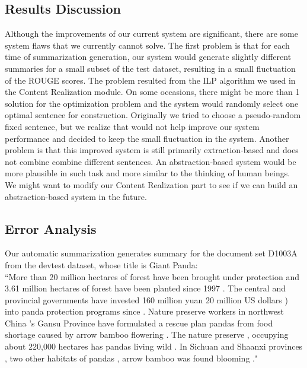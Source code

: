 \documentclass[11pt]{article}
\begin{document}
\subsection{Results Discussion}
Although the improvements of our current system are significant, there are some system flaws that we currently cannot solve. The first problem is that for each time of summarization generation, our system would generate slightly different summaries for a small subset of the test dataset, resulting in a small fluctuation of the ROUGE scores. The problem resulted from the ILP algorithm we used in the Content Realization module. On some occasions, there might be more than 1 solution for the optimization problem and the system would randomly select one optimal sentence for construction. Originally we tried to choose a pseudo-random fixed sentence, but we realize that would not help improve our system performance and decided to keep the small fluctuation in the system.
\indent
Another problem is that this improved system is still primarily extraction-based and does not combine combine different sentences. An abstraction-based system would be more plausible in such task and more similar to the thinking of human beings. We might want to modify our Content Realization part to see if we can build an abstraction-based system in the future.
\subsection{Error Analysis}
Our automatic summarization generates summary for the document set D1003A from the devtest dataset, whose title is Giant Panda:\\

``More than 20 million hectares of forest have been brought under protection and 3.61 million hectares of forest have been planted since 1997 .
The central and provincial governments have invested 160 million yuan 20 million US dollars ) into panda protection programs since .
Nature preserve workers in northwest China 's Gansu Province have formulated a rescue plan pandas from food shortage caused by arrow bamboo flowering .
The nature preserve , occupying about 220,000 hectares has pandas living wild .
In Sichuan and Shaanxi provinces , two other habitats of pandas , arrow bamboo was found blooming ."\\
\end{document}
